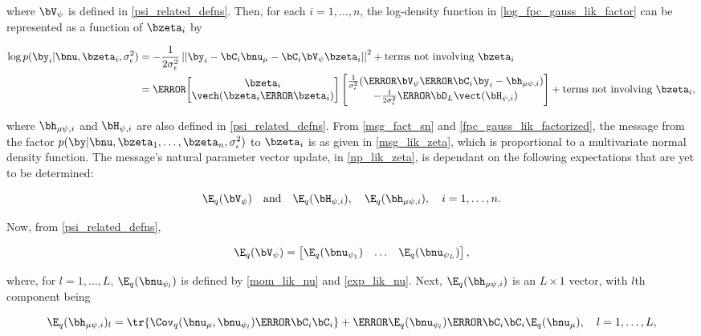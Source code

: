 \documentclass[12pt]{article}
\def\sigsqeps{\sigma^2_{\epsilon}}
\def\numu{\bnu_\mu}
\def\Vpsi{\bV_\psi}
\newcommand\nupsi[1]{\bnu_{\psi_{#1}}}
\newcommand\hmupsi[1]{\bh_{\mu \psi, i}}
\newcommand\Hpsi[1]{\bH_{\psi, i}}
\newcommand\tni[1]{\text{terms not involving $#1$}}
\theoremstyle{plain}
\theoremstyle{definition}
\theoremstyle{remark}
\begin{document}
\noindent where $\Vpsi$ is defined in \eqref{psi_related_defns}. Then, for each $i = 1, \dots, n$, the log-density function
in \eqref{log_fpc_gauss_lik_factor} can be represented as a function of $\bzeta_i$ by

\begin{align*}
	\log p (\by_i | \bnu, \bzeta_i, \sigsqeps)
		& = -\frac{1}{2\sigsqeps} \left|\left|
			\by_i - \bC_i \numu - \bC_i \Vpsi \bzeta_i
		\right|\right|^2 + \tni{\bzeta_i} \\
		& = \T{
			\begin{bmatrix}
				\bzeta_i \\
				\vech (\bzeta_i \T{\bzeta_i})
			\end{bmatrix}
		} \begin{bmatrix}
			\frac{1}{\sigsqeps} (\T{\Vpsi} \T{\bC_i} \by_i - \hmupsi{i}) \\
			-\frac{1}{2 \sigsqeps} \T{\bD_L} \vect (\Hpsi{i})
		\end{bmatrix} + \tni{\bzeta_i},
\end{align*}

\noindent where $\hmupsi{i}$ and $\Hpsi{i}$ are also defined in \eqref{psi_related_defns}.
\noindent From \eqref{msg_fact_sn} and \eqref{fpc_gauss_lik_factorized}, the message from the factor
$p (\by | \bnu, \bzeta_1, \dots, \bzeta_n, \sigsqeps)$ to $\bzeta_i$ is as given in \eqref{msg_lik_zeta}, which
is proportional to a multivariate normal density function. The message's natural parameter vector update, in
\eqref{np_lik_zeta}, is dependant on the following expectations that are yet to be determined:

\[
	\E_q (\Vpsi) \quad \text{and} \quad \E_q (\Hpsi{i}), \quad \E_q (\hmupsi{i}), \quad i = 1, \dots, n.
\]

\noindent Now, from \eqref{psi_related_defns},

\begin{equation}
	\E_q (\Vpsi) = \begin{bmatrix}
		\E_q (\nupsi{1}) & \dots & \E_q (\nupsi{L})
	\end{bmatrix},
\label{E_q_Vpsi}
\end{equation}

\noindent where, for $l = 1, \dots, L$, $\E_q (\nupsi{l})$ is defined by \eqref{mom_lik_nu} and \eqref{exp_lik_nu}.
Next, $\E_q (\hmupsi{i})$ is an $L \times 1$ vector, with $l$th component being

\begin{equation}
	\E_q (\hmupsi{i})_l =
		\tr \{ \Cov_q (\numu, \nupsi{l}) \T{\bC_i} \bC_i \}
		+ \T{\E_q (\nupsi{l})} \T{\bC_i} \bC_i \E_q (\numu), \quad
	l = 1, \dots, L,
\label{exp_lik_hmupsi}
\end{equation}
\end{document}
